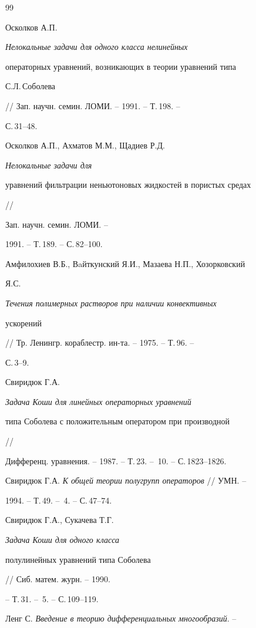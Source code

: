 \begin{thebibliography}{99}







Осколков А.П. {\em Нелокальные задачи для одного класса нелинейных


операторных уравнений, возникающих в теории уравнений типа


С.Л.\,Соболева} // Зап. научн. семин. ЛОМИ. -- 1991. -- Т.\,198. --


С.\,31--48.




Осколков А.П., Ахматов М.М., Щадиев Р.Д. {\em Нелокальные задачи для


уравнений фильтрации неньютоновых жидкостей в пористых средах} //


Зап. научн. семин. ЛОМИ. --


1991. -- Т.\,189. -- С.\,82--100.




Амфилохиев В.Б., Вaйткунский Я.И., Мазаева Н.П., Хозорковский


Я.С. {\em Течения полимерных растворов при наличии конвективных


ускорений} // Тр. Ленингр. кораблестр. ин-та. -- 1975. -- Т.\,96. --


С.\,3--9.




Свиридюк Г.А. {\em Задача Коши для линейных операторных уравнений


типа Соболева с положительным оператором при производной} //


Дифференц. уравнения. -- 1987. -- Т.\,23. -- \No\,10. -- С.\,1823--1826.




Свиридюк Г.А. {\em К общей теории полугрупп операторов} // УМН. --


1994. -- Т.\,49. -- \No\,4. -- С.\,47--74.




Свиридюк Г.А., Сукачева Т.Г. {\em Задача Коши для одного класса


полулинейных уравнений типа Соболева} // Сиб. матем. журн. -- 1990.


-- Т.\,31. -- \No\,5. -- С.\,109--119.




Ленг С. {\em Введение в теорию дифференциальных многообразий}. --



\end{thebibliography}
